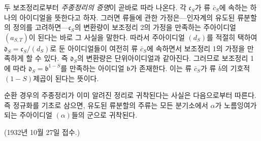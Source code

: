 
두 보조정리로부터 \emph{주종정리의 증명}이 곧바로 따라 나온다. 각 \(\mathfrak c_S\)가 류 \(\bar c_S\)에 속하는 하나의 아이디얼을 뜻한다고 하자. 그러면 류들에 관한 가정은---인자계의 유도된 류분할의 정의를 고려하면---\(\mathfrak c_S\)의 변환량이 보조정리 2의 가정을 만족하는 주아이디얼 \((a_{S,T})\)이 된다는 바로 그 사실을 말한다. 따라서 주아이디얼 \((d_S)\)를 적절히 택하여 \(\mathfrak d_S=\mathfrak c_S/(d_S)\)로 둔 아이디얼들이 여전히 류 \(\bar c_S\)에 속하면서 보조정리 1의 가정을 만족하게 할 수 있다. 즉 \(\mathfrak d_S\)의 변환량은 단위아이디얼과 같아진다. 그러므로 보조정리 1에 따라 \(\mathfrak d_S=\mathfrak b^{1-S}\)를 만족하는 아이디얼 \(\mathfrak b\)가 존재한다. 이는 류 \(\bar c_S\)가 류 \(\bar b\)의 기호적 \((1-S)\)제곱이 된다는 뜻이다.

순환 경우의 주종정리가 이미 알려진 정리로 귀착된다는 사실은 다음으로부터 따른다. 즉 정규화를 기초로 삼으면, 유도된 류분할의 주류는 모든 분기소에서 \(\alpha\)가 노름잉여가 되는 주아이디얼 \((\alpha)\)들의 군으로 귀착된다.

\begin{center}
(1932년 10월 27일 접수.)
\end{center}
